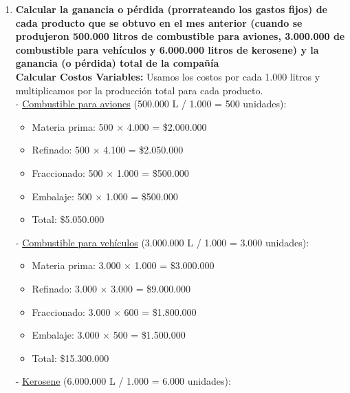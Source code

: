 \documentclass[10pt,a4paper]{article}
\begin{document}
\begin{enumerate}[label=\textbf{\sffamily\large\arabic*.}]
    \item {\bfseries\large Calcular la ganancia o pérdida (prorrateando los gastos fijos) de cada producto que se obtuvo en el mes
    anterior (cuando se produjeron 500.000 litros de combustible para aviones, 3.000.000 de combustible para
    vehículos y 6.000.000 litros de kerosene) y la ganancia (o pérdida) total de la compañía} \\

    \textbf{Calcular Costos Variables:} Usamos los costos por cada 1.000 litros y multiplicamos por la producción total para cada producto. \\

    - \underline{Combustible para aviones} (500.000 L / 1.000 = 500 unidades):

    \begin{itemize}

        \item Materia prima: 500 × 4.000 = \$2.000.000
        \item Refinado: 500 × 4.100 = \$2.050.000
        \item Fraccionado: 500 × 1.000 = \$500.000
        \item Embalaje: 500 × 1.000 = \$500.000 \\
        \item Total: \$5.050.000

    \end{itemize}

    - \underline{Combustible para vehículos} (3.000.000 L / 1.000 = 3.000 unidades):

    \begin{itemize}

        \item Materia prima: 3.000 × 1.000 = \$3.000.000
        \item Refinado: 3.000 × 3.000 = \$9.000.000
        \item Fraccionado: 3.000 × 600 = \$1.800.000
        \item Embalaje: 3.000 × 500 = \$1.500.000 \\
        \item Total: \$15.300.000

    \end{itemize}

    - \underline{Kerosene} (6.000.000 L / 1.000 = 6.000 unidades):

    \begin{itemize}


\end{itemize}
\end{enumerate}
\end{document}
